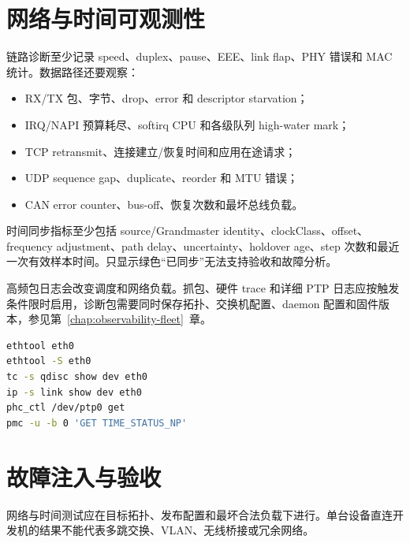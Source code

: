 \section{网络与时间可观测性}

链路诊断至少记录 speed、duplex、pause、EEE、link flap、PHY 错误和 MAC 统计。数据路径还要观察：

\begin{itemize}
  \item RX/TX 包、字节、drop、error 和 descriptor starvation；
  \item IRQ/NAPI 预算耗尽、softirq CPU 和各级队列 high-water mark；
  \item TCP retransmit、连接建立/恢复时间和应用在途请求；
  \item UDP sequence gap、duplicate、reorder 和 MTU 错误；
  \item CAN error counter、bus-off、恢复次数和最坏总线负载。
\end{itemize}

时间同步指标至少包括 source/Grandmaster identity、clockClass、offset、frequency adjustment、path delay、uncertainty、holdover age、step 次数和最近一次有效样本时间。只显示绿色“已同步”无法支持验收和故障分析。

高频包日志会改变调度和网络负载。抓包、硬件 trace 和详细 PTP 日志应按触发条件限时启用，诊断包需要同时保存拓扑、交换机配置、daemon 配置和固件版本，参见\mbox{第~\ref{chap:observability-fleet}~章}。

\begin{lstlisting}[language=bash,caption={网络与 PTP 的常用观测入口}]
ethtool eth0
ethtool -S eth0
tc -s qdisc show dev eth0
ip -s link show dev eth0
phc_ctl /dev/ptp0 get
pmc -u -b 0 'GET TIME_STATUS_NP'
\end{lstlisting}

\section{故障注入与验收}

网络与时间测试应在目标拓扑、发布配置和最坏合法负载下进行。单台设备直连开发机的结果不能代表多跳交换、VLAN、无线桥接或冗余网络。

